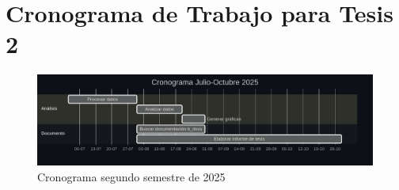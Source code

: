 
\chapter{Cronograma de Trabajo para Tesis 2}

\begin{figure}[ht]
    \centering
	\includegraphics[width=1\textwidth]{figures/cronograma_2.png}
	\caption[Cronograma segundo semestre de 2025]{Cronograma segundo semestre de 2025}
	\label{fig:fig_cron_2}
\end{figure}
